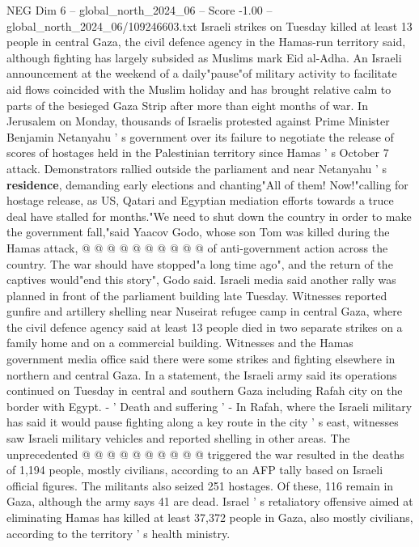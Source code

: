 \begin{textsample}{NEG Dim 6 – global\_north\_2024\_06 – Score -1.00 – global\_north\_2024\_06/109246603.txt}  \label{ex:f6_neg_307}
Israeli strikes on Tuesday killed at least 13 people in central Gaza, the civil defence agency in the Hamas-run territory said, although fighting has largely subsided as Muslims mark Eid al-Adha.
An Israeli announcement at the weekend of a daily"pause"of military activity to facilitate aid flows coincided with the Muslim holiday and has brought relative calm to parts of the besieged Gaza Strip after more than eight months of war.
In Jerusalem on Monday, thousands of Israelis protested against Prime Minister Benjamin Netanyahu ' s government over its failure to negotiate the release of scores of hostages held in the Palestinian territory since Hamas ' s October 7 attack.
Demonstrators rallied outside the parliament and near Netanyahu ' s \textbf{residence}, demanding early elections and chanting"All of them!
Now!"calling for hostage release, as US, Qatari and Egyptian mediation efforts towards a truce deal have stalled for months."We need to shut down the country in order to make the government fall,"said Yaacov Godo, whose son Tom was killed during the Hamas attack, @ @ @ @ @ @ @ @ @ @ of anti-government action across the country.
The war should have stopped"a long time ago", and the return of the captives would"end this story", Godo said.
Israeli media said another rally was planned in front of the parliament building late Tuesday.
Witnesses reported gunfire and artillery shelling near Nuseirat refugee camp in central Gaza, where the civil defence agency said at least 13 people died in two separate strikes on a family home and on a commercial building.
Witnesses and the Hamas government media office said there were some strikes and fighting elsewhere in northern and central Gaza.
In a statement, the Israeli army said its operations continued on Tuesday in central and southern Gaza including Rafah city on the border with Egypt. - ' Death and suffering ' - In Rafah, where the Israeli military has said it would pause fighting along a key route in the city ' s east, witnesses saw Israeli military vehicles and reported shelling in other areas.
The unprecedented @ @ @ @ @ @ @ @ @ @ triggered the war resulted in the deaths of 1,194 people, mostly civilians, according to an AFP tally based on Israeli official figures.
The militants also seized 251 hostages.
Of these, 116 remain in Gaza, although the army says 41 are dead.
Israel ' s retaliatory offensive aimed at eliminating Hamas has killed at least 37,372 people in Gaza, also mostly civilians, according to the territory ' s health ministry.

\end{textsample}
